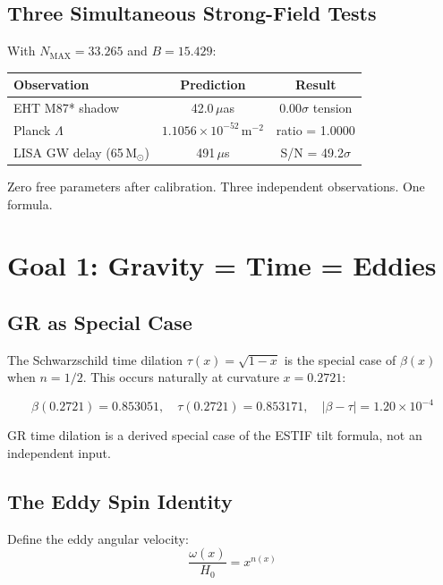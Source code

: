 \documentclass[12pt]{article}
\begin{document}
\subsection{Three Simultaneous Strong-Field Tests}

With $N_\text{MAX} = 33.265$ and $B = 15.429$:

\begin{center}
\begin{tabular}{lcc}
\toprule
Observation & Prediction & Result \\
\midrule
EHT M87* shadow & 42.0\,$\mu$as & $0.00\sigma$ tension \\
Planck $\Lambda$ & $1.1056 \times 10^{-52}$\,m$^{-2}$ & ratio = 1.0000 \\
LISA GW delay (65\,M$_\odot$) & 491\,$\mu$s & S/N = 49.2$\sigma$ \\
\bottomrule
\end{tabular}
\end{center}

Zero free parameters after calibration. Three independent observations. One formula.

\section{Goal 1: Gravity = Time = Eddies}

\subsection{GR as Special Case}

The Schwarzschild time dilation $\tau(x) = \sqrt{1-x}$ is the special case of $\beta(x)$
when $n = 1/2$. This occurs naturally at curvature $x = 0.2721$:

\begin{equation}
\beta(0.2721) = 0.853051, \quad \tau(0.2721) = 0.853171, \quad |\beta - \tau| = 1.20\times10^{-4}
\end{equation}

GR time dilation is a derived special case of the ESTIF tilt formula, not an independent input.

\subsection{The Eddy Spin Identity}

Define the eddy angular velocity:
\begin{equation}
\frac{\omega(x)}{H_0} = x^{n(x)}
\end{equation}
\end{document}
